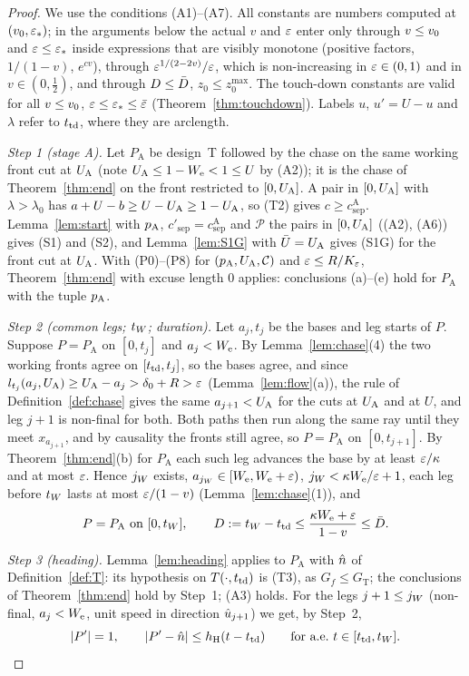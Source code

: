 \begin{proof}
We use the conditions (A1)--(A7). All constants are numbers computed at $(v_0,\varepsilon_*)$; in the arguments below the actual $v$ and
$\varepsilon$ enter only through $v\le v_0$ and $\varepsilon\le\varepsilon_*$ inside expressions that are visibly monotone (positive factors,
$1/(1-v)$, $e^{cv}$), through $\varepsilon^{1/(2-2v)}/\varepsilon$, which is non-increasing in $\varepsilon\in(0,1)$ and in $v\in(0,\frac12)$, and through
$D\le\bar D$, $z_0\le z_0^{\max}$. The touch-down constants are valid for all $v\le v_0$, $\varepsilon\le\varepsilon_*\le\bar\varepsilon$
(Theorem~\ref{thm:touchdown}). Labels $u$, $u'=U-u$ and $\lambda$ refer to $t_{\mathrm{td}}$, where they are arclength.

\emph{Step 1 (stage A).} Let $P_{\mathrm A}$ be design~T followed by the chase on the same working front cut at $U_{\mathrm A}$ (note
$U_{\mathrm A}\le1-W_{\mathrm e}<1\le U$ by (A2)); it is the chase of Theorem~\ref{thm:end} on the front restricted to $[0,U_{\mathrm A}]$. A pair in $[0,U_{\mathrm A}]$
with $\lambda>\lambda_0$ has $a+U-b\ge U-U_{\mathrm A}\ge1-U_{\mathrm A}$, so (T2) gives $c\ge c_{\mathrm{sep}}^{\mathrm A}$. Lemma~\ref{lem:start}
with $p_{\mathrm A}$, $c'_{\mathrm{sep}}=c^{\mathrm A}_{\mathrm{sep}}$ and $\mathcal P$ the pairs in $[0,U_{\mathrm A}]$ ((A2), (A6)) gives (S1) and
(S2), and Lemma~\ref{lem:S1G} with $\bar U=U_{\mathrm A}$ gives (S1G) for the front cut at $U_{\mathrm A}$. With (P0)--(P8) for $(p_{\mathrm A},U_{\mathrm A},\mathcal C)$ and
$\varepsilon\le R/K_\varepsilon$, Theorem~\ref{thm:end} with excuse length $0$ applies: conclusions (a)--(e) hold for $P_{\mathrm A}$ with the tuple
$p_{\mathrm A}$.

\emph{Step 2 (common legs; $t_W$; duration).} Let $a_j,t_j$ be the bases and leg starts of $P$. Suppose $P=P_{\mathrm A}$ on
$[0,t_j]$ and $a_j<W_{\mathrm e}$. By Lemma~\ref{lem:chase}(4) the two working fronts agree on $[t_{\mathrm{td}},t_j]$, so the bases agree, and since
$l_{t_j}(a_j,U_{\mathrm A})\ge U_{\mathrm A}-a_j>\delta_0+R>\varepsilon$ (Lemma~\ref{lem:flow}(a)), the rule of Definition~\ref{def:chase} gives the same
$a_{j+1}<U_{\mathrm A}$ for the cuts at $U_{\mathrm A}$ and at $U$, and leg $j+1$ is non-final for both. Both paths then run along the same ray
until they meet $x_{a_{j+1}}$, and by causality the fronts still agree, so $P=P_{\mathrm A}$ on $[0,t_{j+1}]$. By
Theorem~\ref{thm:end}(b) for $P_{\mathrm A}$ each such leg advances the base by at least $\varepsilon/\kappa$ and at most $\varepsilon$. Hence
$j_W$ exists, $a_{j_W}\in[W_{\mathrm e},W_{\mathrm e}+\varepsilon)$, $j_W<\kappa W_{\mathrm e}/\varepsilon+1$, each leg before $t_W$ lasts at most $\varepsilon/(1-v)$
(Lemma~\ref{lem:chase}(1)), and
\[
P=P_{\mathrm A}\ \text{on }[0,t_W],\qquad D:=t_W-t_{\mathrm{td}}\le\frac{\kappa W_{\mathrm e}+\varepsilon}{1-v}\le\bar D .
\]

\emph{Step 3 (heading).} Lemma~\ref{lem:heading} applies to $P_{\mathrm A}$ with $\hat n$ of Definition~\ref{def:T}: its hypothesis on
$T(\cdot,t_{\mathrm{td}})$ is (T3), as $G_f\le G_{\mathrm T}$; the conclusions of Theorem~\ref{thm:end} hold by Step~1; (A3) holds. For the legs
$j+1\le j_W$ (non-final, $a_j<W_{\mathrm e}$, unit speed in direction $\hat u_{j+1}$) we get, by Step~2,
\[
|P'|=1,\qquad|P'-\hat n|\le h_{\mathrm H}(t-t_{\mathrm{td}})\qquad\text{for a.e.\ }t\in[t_{\mathrm{td}},t_W].
\]


\end{proof}
